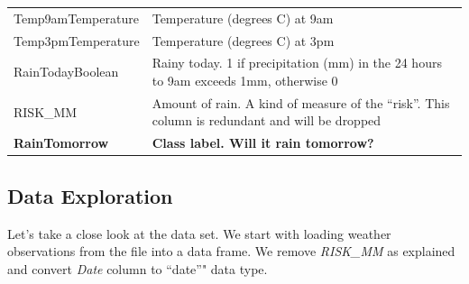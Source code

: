 \begin{longtable}[]{@{}ll@{}}
\begin{minipage}[t]{0.52\columnwidth}\raggedright
Temp9amTemperature\strut
\end{minipage} & \begin{minipage}[t]{0.43\columnwidth}\raggedright
Temperature (degrees C) at 9am\strut
\end{minipage}\tabularnewline
\begin{minipage}[t]{0.52\columnwidth}\raggedright
Temp3pmTemperature\strut
\end{minipage} & \begin{minipage}[t]{0.43\columnwidth}\raggedright
Temperature (degrees C) at 3pm\strut
\end{minipage}\tabularnewline
\begin{minipage}[t]{0.52\columnwidth}\raggedright
RainTodayBoolean\strut
\end{minipage} & \begin{minipage}[t]{0.43\columnwidth}\raggedright
Rainy today. 1 if precipitation (mm) in the 24 hours to 9am exceeds 1mm,
otherwise 0\strut
\end{minipage}\tabularnewline
\begin{minipage}[t]{0.52\columnwidth}\raggedright
RISK\_MM\strut
\end{minipage} & \begin{minipage}[t]{0.43\columnwidth}\raggedright
Amount of rain. A kind of measure of the ``risk''. This column is
redundant and will be dropped\strut
\end{minipage}\tabularnewline
\begin{minipage}[t]{0.52\columnwidth}\raggedright
\textbf{RainTomorrow}\strut
\end{minipage} & \begin{minipage}[t]{0.43\columnwidth}\raggedright
\textbf{Class label. Will it rain tomorrow?}\strut
\end{minipage}\tabularnewline
\bottomrule
\end{longtable}

\hypertarget{data-exploration}{%
\subsection{Data Exploration}\label{data-exploration}}

Let's take a close look at the data set. We start with loading weather
observations from the file into a data frame. We remove \emph{RISK\_MM}
as explained and convert \emph{Date} column to ``date''" data type.

